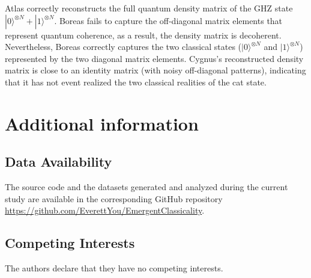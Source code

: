 \documentclass[fleqn,11pt]{wlscirep}
\newcommand{\ket}[1]{|#1 \rangle}
\begin{document}
Atlas correctly reconstructs the full quantum density matrix of the GHZ state $\ket{0}^{\otimes N}+\ket{1}^{\otimes N}$. Boreas fails to capture the off-diagonal matrix elements that represent quantum coherence, as a result, the density matrix is decoherent. Nevertheless, Boreas correctly captures the two classical states ($\ket{0}^{\otimes N}$ and $\ket{1}^{\otimes N}$) represented by the two diagonal matrix elements. Cygnus's reconstructed density matrix is close to an identity matrix (with noisy off-diagonal patterns), indicating that it has not event realized the two classical realities of the cat state.

\section*{Additional information}

\subsection*{Data Availability}
The source code and the datasets generated and analyzed during the current study are available in the corresponding GitHub repository \url{https://github.com/EverettYou/EmergentClassicality}.

\subsection*{Competing Interests}
The authors declare that they have no competing interests.
\end{document}
